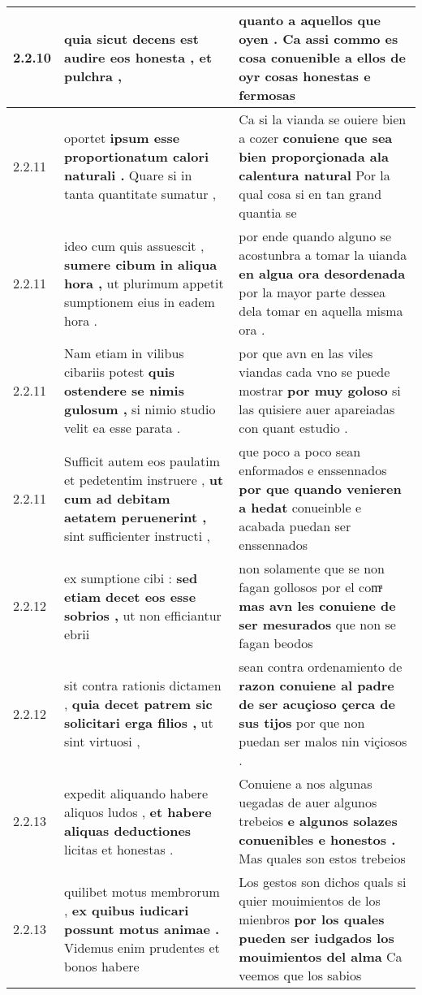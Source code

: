 \begin{tabular}{|p{1cm}|p{6.5cm}|p{6.5cm}|}
2.2.10 & quia sicut decens est \textbf{ audire eos honesta , } et pulchra , & quanto a aquellos que oyen . \textbf{ Ca assi commo es cosa conuenible a ellos de oyr } cosas honestas e fermosas \\\hline
2.2.11 & oportet \textbf{ ipsum esse proportionatum calori naturali . } Quare si in tanta quantitate sumatur , & Ca si la vianda se ouiere bien a cozer \textbf{ conuiene que sea bien proporçionada ala calentura natural } Por la qual cosa si en tan grand quantia se \\\hline
2.2.11 & ideo cum quis assuescit , \textbf{ sumere cibum in aliqua hora , } ut plurimum appetit sumptionem eius in eadem hora . & por ende quando alguno se acostunbra a tomar la uianda \textbf{ en algua ora desordenada } por la mayor parte dessea dela tomar en aquella misma ora . \\\hline
2.2.11 & Nam etiam in vilibus cibariis potest \textbf{ quis ostendere se nimis gulosum , } si nimio studio velit ea esse parata . & por que avn en las viles viandas cada vno se puede mostrar \textbf{ por muy goloso } si las quisiere auer apareiadas con quant estudio . \\\hline
2.2.11 & Sufficit autem eos paulatim et pedetentim instruere , \textbf{ ut cum ad debitam aetatem peruenerint , } sint sufficienter instructi , & que poco a poco sean enformados e enssennados \textbf{ por que quando venieren a hedat } conueinble e acabada puedan ser enssennados \\\hline
2.2.12 & ex sumptione cibi : \textbf{ sed etiam decet eos esse sobrios , } ut non efficiantur ebrii & non solamente que se non fagan gollosos por el comͣ \textbf{ mas avn les conuiene de ser mesurados } que non se fagan beodos \\\hline
2.2.12 & sit contra rationis dictamen , \textbf{ quia decet patrem sic solicitari erga filios , } ut sint virtuosi , & sean contra ordenamiento de \textbf{ razon conuiene al padre de ser acuçioso çerca de sus tijos } por que non puedan ser malos nin viçiosos . \\\hline
2.2.13 & expedit aliquando habere aliquos ludos , \textbf{ et habere aliquas deductiones } licitas et honestas . & Conuiene a nos algunas uegadas de auer algunos trebeios \textbf{ e algunos solazes conuenibles e honestos . } Mas quales son estos trebeios \\\hline
2.2.13 & quilibet motus membrorum , \textbf{ ex quibus iudicari possunt motus animae . } Videmus enim prudentes et bonos habere & Los gestos son dichos quals si quier mouimientos de los mienbros \textbf{ por los quales pueden ser iudgados los mouimientos del alma } Ca veemos que los sabios \\\hline

\end{tabular}
